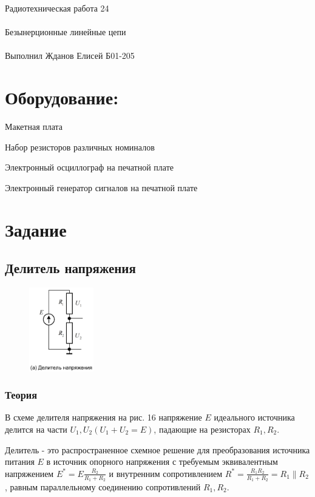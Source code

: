 \documentclass{astroedu-lab}
\begin{document}
\pagestyle{plain}

\begin{problem}{\huge Радиотехническая работа 24\\\\Безынерционные линейные цепи\\\\Выполнил Жданов Елисей Б01-205}

\section{Оборудование:}

Макетная плата

Набор резисторов различных номиналов

Электронный осциллограф на печатной плате

Электронный генератор сигналов на печатной плате

\section{Задание}

\subsection{Делитель напряжения}

\begin{figure}[!h]
	\centering
	\includegraphics[width=0.25\textwidth]{16a.png}
	\label{fig:boiler}
\end{figure}

\subsubsection{Теория}

В схеме делителя напряжения на рис. 16 напряжение $E$ идеального источника делится на части $U_1, U_2\left(U_1+U_2=E\right)$, падающие на резисторах $R_1, R_2$.

Делитель - это распространенное схемное решение для преобразования источника питания $E$ в источник опорного напряжения с требуемым эквивалентным напряжением $E^*=E \frac{R_2}{R_1+R_2}$ и внутренним сопротивлением $R^*=\frac{R_1 R_2}{R_1+R_2}=R_1 \| R_2$, равным параллельному соединению сопротивлений $R_1, R_2$.


\end{problem}
\end{document}
